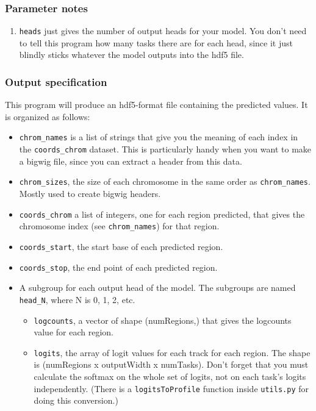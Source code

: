 \documentclass{article}
\begin{document}
\subsubsection{Parameter notes}

\begin{enumerate}
    \item \texttt{heads} just gives the number of output heads for your model. You don't need to
        tell this program how many tasks there are for each head, since it just blindly sticks
        whatever the model outputs into the hdf5 file.
\end{enumerate}

\subsubsection{Output specification}

This program will produce an hdf5-format file containing the predicted values.
It is organized as follows:

\begin{itemize}
    \item \texttt{chrom\_names} is a list of strings that give you the meaning of each index in
        the \texttt{coords\_chrom} dataset.
        This is particularly handy when you want to make a bigwig file, since you can extract a
        header from this data.
    \item \texttt{chrom\_sizes}, the size of each chromosome in the same order as
        \texttt{chrom\_names}. Mostly used to create bigwig headers.
    \item \texttt{coords\_chrom} a list of integers, one for each region predicted, that gives
        the chromosome index (see \texttt{chrom\_names}) for that region.
    \item \texttt{coords\_start}, the start base of each predicted region.
    \item \texttt{coords\_stop}, the end point of each predicted region.
    \item A subgroup for each output head of the model. The subgroups are named
        \texttt{head\_N}, where N is 0, 1, 2, etc.
        \begin{itemize}
            \item \texttt{logcounts}, a vector of shape (numRegions,) that gives the logcounts
                value for each region.
            \item \texttt{logits}, the array of logit values for each track for each region.
                The shape is (numRegions x outputWidth x numTasks).
                Don't forget that you must calculate the softmax on the whole set of logits,
                not on each task's logits independently.
                (There is a \texttt{logitsToProfile} function inside \texttt{utils.py} for
                doing this conversion.)
        \end{itemize}

\end{itemize}
\end{document}

